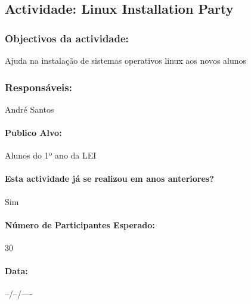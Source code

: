 \subsection{Actividade: Linux Installation Party} %

\subsubsection*{Objectivos da actividade:}
Ajuda na instalação de sistemas operativos linux aos novos alunos

\subsubsection*{Responsáveis:}
\begin{itemizedash}
	\item{André Santos}
\end{itemizedash}

\paragraph{Publico Alvo: }
Alunos do 1º ano da LEI

\paragraph{Esta actividade já se realizou em anos anteriores?}
Sim

\paragraph{Número de Participantes Esperado:}
30

\paragraph{Data:} --/--/----

\vspace{20pt}
